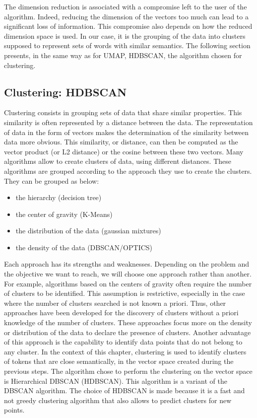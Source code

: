 The dimension reduction is associated with a compromise left to the user of the algorithm.
Indeed, reducing the dimension of the vectors too much can lead to a significant loss of information.
This compromise also depends on how the reduced dimension space is used.
In our case, it is the grouping of the data into clusters supposed to represent sets of words with similar semantics.
The following section presents, in the same way as for UMAP, HDBSCAN, the algorithm chosen for clustering.

\subsection{Clustering: HDBSCAN}
Clustering consists in grouping sets of data that share similar properties.
This similarity is often represented by a distance between the data.
The representation of data in the form of vectors makes the determination of the similarity between data more obvious.
This similarity, or distance, can then be computed as the vector product (or L2 distance) or the cosine between these two vectors.
Many algorithms allow to create clusters of data, using different distances.
These algorithms are grouped according to the approach they use to create the clusters.
They can be grouped as below:

\begin{itemize}
    \item the hierarchy (decision tree)
    \item the center of gravity (K-Means)
    \item the distribution of the data (gaussian mixtures)
    \item the density of the data (DBSCAN/OPTICS)
\end{itemize}

Each approach has its strengths and weaknesses.
Depending on the problem and the objective we want to reach, we will choose one approach rather than another.
For example, algorithms based on the centers of gravity often require the number of clusters to be identified.
This assumption is restrictive, especially in the case where the number of clusters searched is not known a priori.
Thus, other approaches have been developed for the discovery of clusters without a priori knowledge of the number of clusters.
These approaches focus more on the density or distribution of the data to declare the presence of clusters.
Another advantage of this approach is the capability to identify data points that do not
belong to any cluster.
In the context of this chapter, clustering is used to identify clusters of tokens that
are close semantically, in the vector space created during the previous steps.
The algorithm chose to perform the clustering on the vector space is Hierarchical DBSCAN (HDBSCAN).
This algorithm is a variant of the DBSCAN algorithm.
The choice of HDBSCAN is made because it is a fast and not greedy clustering algorithm that
also allows to predict clusters for new points.

